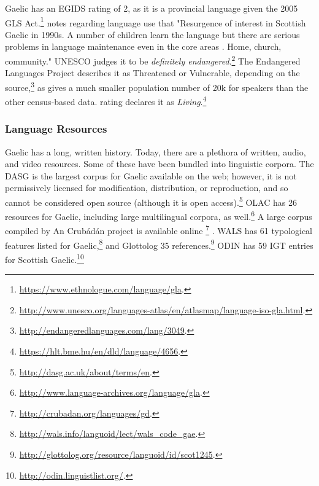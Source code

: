 
Gaelic has an EGIDS rating of 2, as it is a provincial language given the 2005 GLS Act.\footnote{\href{https://www.ethnologue.com/language/gla}{https://www.ethnologue.com/language/gla}. }  \citet{lewis2009ethnologue} notes regarding language use that "Resurgence of interest in Scottish Gaelic in 1990s. A number of children learn the language but there are serious problems in language maintenance even in the core areas \citep{salminen2007endangered}. Home, church, community." UNESCO judges it to be {\it definitely endangered}.\footnote{\href{http://www.unesco.org/languages-atlas/en/atlasmap/language-iso-gla.html}{http://www.unesco.org/languages-atlas/en/atlasmap/language-iso-gla.html}. } The Endangered Languages Project describes it as Threatened or Vulnerable, depending on the source,\footnote{\href{http://endangeredlanguages.com/lang/3049}{http://endangeredlanguages.com/lang/3049}. } as \citet{salminen2007europe} gives a much smaller population number of 20k for speakers than the other census-based data.  rating declares it as {\it Living}.\footnote{\href{https://hlt.bme.hu/en/dld/language/4656}{https://hlt.bme.hu/en/dld/language/4656}. }

\subsubsection{Language Resources}
\label{subsec:gaelic-resources}

Gaelic has a long, written history. Today, there are a plethora of written, audio, and video resources. Some of these have been bundled into linguistic corpora. The DASG is the largest corpus for Gaelic available on the web; however, it is not permissively licensed for modification, distribution, or reproduction, and so cannot be considered open source (although it is open access).\footnote{\href{http://dasg.ac.uk/about/terms/en}{http://dasg.ac.uk/about/terms/en}. } OLAC has 26 resources for Gaelic, including large multilingual corpora, as well.\footnote{\href{http://www.language-archives.org/language/gla}{http://www.language-archives.org/language/gla}. } A large corpus compiled by An Crub\'ad\'an project is available online \footnote{\href{http://crubadan.org/languages/gd}{http://crubadan.org/languages/gd}. } \citep{scannell2007crubadan}. WALS has 61 typological features listed for Gaelic,\footnote{\href{http://wals.info/languoid/lect/wals_code_gae}{http://wals.info/languoid/lect/wals\_code\_gae}. } and Glottolog 35 references.\footnote{\href{http://glottolog.org/resource/languoid/id/scot1245}{http://glottolog.org/resource/languoid/id/scot1245}. } ODIN has 59 IGT entries for Scottish Gaelic.\footnote{\href{http://odin.linguistlist.org/}{http://odin.linguistlist.org/}. }

